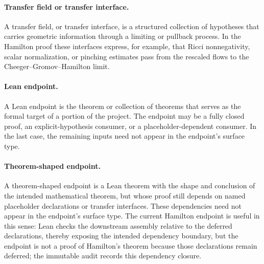 \documentclass[11pt]{article}
\theoremstyle{plain}
\theoremstyle{definition}
\theoremstyle{remark}
\begin{document}
\paragraph{Transfer field or transfer interface.}
A transfer field, or transfer interface, is a structured collection of
hypotheses that carries geometric information through a limiting or pullback
process.  In the Hamilton proof these interfaces express, for example, that
Ricci nonnegativity, scalar normalization, or pinching estimates pass from the
rescaled flows to the Cheeger--Gromov--Hamilton limit.

\paragraph{Lean endpoint.}
A Lean endpoint is the theorem or collection of theorems that serves as the
formal target of a portion of the project.  The endpoint may be a fully closed
proof, an explicit-hypothesis consumer, or a placeholder-dependent consumer.
In the last case, the remaining inputs need not appear in the endpoint's
surface type.

\paragraph{Theorem-shaped endpoint.}
A theorem-shaped endpoint is a Lean theorem with the shape and conclusion of
the intended mathematical theorem, but whose proof still depends on named
placeholder declarations or transfer interfaces.  These dependencies need not
appear in the endpoint's surface type.  The current Hamilton endpoint is useful
in this sense: Lean checks the downstream assembly relative to the deferred
declarations, thereby exposing the intended dependency boundary, but the
endpoint is not a proof of Hamilton's theorem because those declarations remain
deferred; the immutable audit records this dependency closure.
\end{document}
